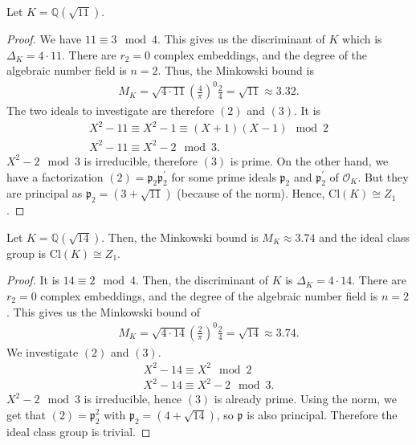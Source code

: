 \begin{exmbox}
    \begin{example}
        Let \(K = \mathbb{Q}(\sqrt{11})\).
    \end{example}
\end{exmbox}
\begin{proof}
    We have \(11 \equiv 3 \mod{4}\). This gives us the discriminant of \(K\) which is \(\Delta_K = 4 \cdot 11\). There are \(r_2 = 0\) complex embeddings, and the degree of the algebraic number field is \(n = 2\). Thus, the Minkowski bound is
    \begin{align*}
        M_K = \sqrt{4 \cdot 11} \left(\frac{4}{\pi}\right)^0 \frac{2}{4} = \sqrt{11} \approx 3.32 \text{.}
    \end{align*}
    The two ideals to investigate are therefore \((2)\) and \((3)\). It is
    \begin{align*}
        X^2 - 11 \equiv X^2 - 1 \equiv (X + 1)(X - 1) \mod{2} \\
        X^2 - 11 \equiv X^2 - 2 \mod{3} \text{.}
    \end{align*}
    \(X^2 - 2 \mod{3}\) is irreducible, therefore \((3)\) is prime. On the other hand, we have a factorization \((2) = \mathfrak{p}_2 \mathfrak{p}_2^\prime\) for some prime ideals \(\mathfrak{p}_2\) and \(\mathfrak{p}_2^\prime\) of \(\mathcal{O}_K\). But they are principal as \(\mathfrak{p}_2 = (3 + \sqrt{11})\) (because of the norm). Hence, \(\mathrm{Cl}(K) \cong Z_1\).
\end{proof}

\begin{exmbox}
    \begin{example}
        Let \(K = \mathbb{Q}(\sqrt{14})\). Then, the Minkowski bound is \(M_K \approx 3.74\) and the ideal class group is \(\mathrm{Cl}(K) \cong Z_1\).
    \end{example}
\end{exmbox}
\begin{proof}
    It is \(14 \equiv 2 \mod{4}\). Then, the discriminant of \(K\) is \(\Delta_K = 4 \cdot 14\). There are \(r_2 = 0\) complex embeddings, and the degree of the algebraic number field is \(n = 2\). This gives us the Minkowski bound of
    \begin{align*}
        M_K = \sqrt{4 \cdot 14} \left(\frac{2}{\pi}\right)^0 \frac{2}{4} = \sqrt{14} \approx 3.74 \text{.}
    \end{align*}
    We investigate \((2)\) and \((3)\).
    \begin{align*}
        X^2 - 14 \equiv X^2 \mod{2} \\
        X^2 - 14 \equiv X^2 - 2 \mod{3} \text{.}
    \end{align*}
    \(X^2 - 2 \mod{3}\) is irreducible, hence \((3)\) is already prime. Using the norm, we get that \((2) = \mathfrak{p}_2^2\) with \(\mathfrak{p}_2 = (4 + \sqrt{14})\), so \(\mathfrak{p}\) is also principal. Therefore the ideal class group is trivial. 
\end{proof}













